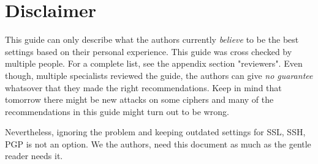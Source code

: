 \section{Disclaimer}
This guide can only describe what the authors currently \emph{believe} to be the best settings based on their personal experience. This guide was cross checked by multiple people. For a complete list, see the appendix section "reviewers". Even though, multiple specialists reviewed the guide, the authors can give \emph{no guarantee} whatsover that they made the right recommendations. Keep in mind that tomorrow there might be new attacks on some ciphers and many of the recommendations in this guide might turn out to be wrong.


Nevertheless, ignoring the problem and keeping outdated settings for SSL, SSH, PGP is not an option. We the authors, need this document as much as the gentle reader needs it.


